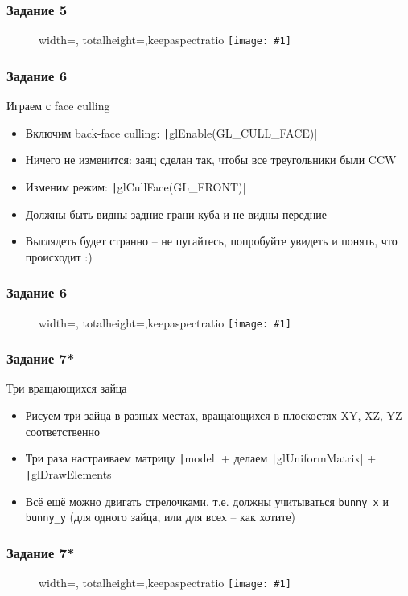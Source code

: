 \documentclass[10pt]{beamer}
\newcommand{\slideimage}[1]{
  \begin{figure}
    \begin{adjustbox}{width=\textwidth, totalheight=\textheight-2\baselineskip-2\baselineskip,keepaspectratio}
      \texttt{[image: \#1]}
    \end{adjustbox}
  \end{figure}
}
\begin{document}
\begin{frame}[fragile]
\frametitle{Задание 5}
\slideimage{5.png}
\end{frame}

\begin{frame}[fragile]
\frametitle{Задание 6}
Играем с face culling
\begin{itemize}
\item Включим back-face culling: \texttt|glEnable(GL_CULL_FACE)|
\item Ничего не изменится: заяц сделан так, чтобы все треугольники были CCW
\item Изменим режим: \texttt|glCullFace(GL_FRONT)|
\item Должны быть видны задние грани куба и не видны передние
\item Выглядеть будет странно -- не пугайтесь, попробуйте увидеть и понять, что происходит :)
\end{itemize}
\end{frame}

\begin{frame}[fragile]
\frametitle{Задание 6}
\slideimage{6.png}
\end{frame}

\begin{frame}[fragile]
\frametitle{Задание 7*}
Три вращающихся зайца
\begin{itemize}
\item Рисуем три зайца в разных местах, вращающихся в плоскостях XY, XZ, YZ соответственно
\item Три раза настраиваем матрицу \texttt|model| + делаем \texttt|glUniformMatrix| + \texttt|glDrawElements|
\item Всё ещё можно двигать стрелочками, т.е. должны учитываться \verb|bunny_x| и \verb|bunny_y| (для одного зайца, или для всех -- как хотите)
\end{itemize}
\end{frame}

\begin{frame}[fragile]
\frametitle{Задание 7*}
\slideimage{7.png}
\end{frame}
\end{document}
